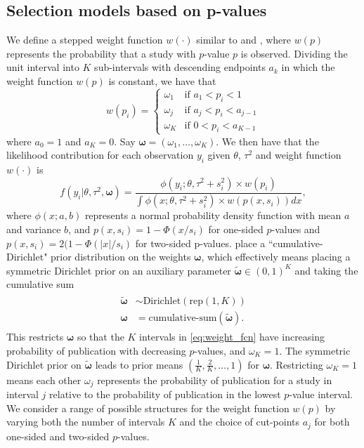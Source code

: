 \documentclass[12pt]{article}   	%
\numberwithin{equation}{section}
\begin{document}
\subsection{Selection models based on p-values} \label{sec:pvalue}

We define a stepped weight function $w(\cdot)$ similar to \citet{vevea1995pubbias} and \citet{vevea2005sensitivity}, where $w(p)$ represents the probability that a study with $p$-value $p$ is observed. Dividing the unit interval into $K$ sub-intervals with descending endpoints $a_k$ in which the weight function $w(p)$ is constant, we have that
\begin{equation} %
w(p_i) =
	\begin{cases}
		\omega_1 & \text{if $a_1 < p_i < 1$} \\
		\omega_j & \text{if $a_{j} < p_i < a_{j-1}$} \\
		\omega_K & \text{if $0 < p_i < a_{K-1}$}
	\end{cases} \label{eq:weight_fcn}
\end{equation}
where $a_0 = 1$ and $a_K = 0$. Say $\boldsymbol{\omega} = (\omega_1, \dots, \omega_K)$. We then have that the likelihood contribution for each observation $y_i$ given $\theta$, $\tau^2$ and weight function $w(\cdot)$ is 
\begin{equation} %
f(y_i \vert \theta, \tau^2, \boldsymbol{\omega}) = \frac{\phi(y_i ; \theta, \tau^2 + s_i^2) \times w(p_i)}{\int \phi(x ; \theta, \tau^2 + s_i^2) \times w(p(x, s_i)) dx}, \label{eq:weightednormal}
\end{equation}
where $\phi(x; a, b)$ represents a normal probability density function with mean $a$ and variance $b$, and $p(x, s_i) = 1 - \Phi(x / s_i)$ for one-sided $p$-values and $p(x, s_i) = 2(1 - \Phi(\vert x \vert / s_i)$ for two-sided p-values. \citet{maier2020robma} place a ``cumulative-Dirichlet" prior distribution on the weights $\boldsymbol{\omega}$, which effectively means placing a symmetric Dirichlet prior on an auxiliary parameter $\widetilde{\boldsymbol{\omega}} \in (0, 1)^K$ and taking the cumulative sum 
\begin{align}
\begin{split}
\widetilde{\boldsymbol{\omega}} & \sim \text{Dirichlet}(\text{rep}(1, K))  \\
\boldsymbol{\omega} &= \text{cumulative-sum}(\widetilde{\boldsymbol{\omega}}). 
\end{split}
\end{align}
This restricts $\boldsymbol{\omega}$ so that the $K$ intervals in \eqref{eq:weight_fcn} have increasing probability of publication with decreasing $p$-values, and $\omega_K = 1$. The symmetric Dirichlet prior on $\widetilde{\boldsymbol{\omega}}$ leads to prior means $(\frac{1}{K}, \frac{2}{K}, \dots, 1)$ for $\boldsymbol{\omega}$. Restricting $\omega_K = 1$ means each other $\omega_j$ represents the probability of publication for a study in interval $j$ relative to the probability of publication in the lowest $p$-value interval. We consider a range of possible structures for the weight function $w(p)$ by varying both the number of intervals $K$ and the choice of cut-points $a_j$ for both one-sided and two-sided $p$-values.
\end{document}
